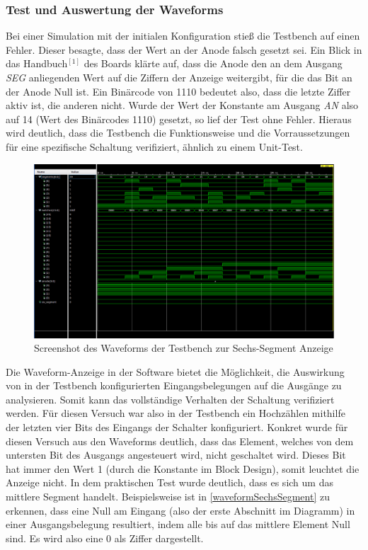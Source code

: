 \documentclass[11pt, a4paper]{article}
\begin{document}
\subsubsection*{Test und Auswertung der Waveforms}
Bei einer Simulation mit der initialen Konfiguration stieß die Testbench auf einen Fehler. Dieser besagte, dass der Wert an der Anode falsch gesetzt sei. Ein Blick in das Handbuch$^{[1]}$ des Boards klärte auf, dass die Anode den an dem Ausgang \textit{SEG} anliegenden Wert auf die Ziffern der Anzeige weitergibt, für die das Bit an der Anode Null ist. Ein Binärcode von 1110 bedeutet also, dass die letzte Ziffer aktiv ist, die anderen nicht.
Wurde der Wert der Konstante am Ausgang \textit{AN} also auf 14 (Wert des Binärcodes 1110) gesetzt, so lief der Test ohne Fehler.
Hieraus wird deutlich, dass die Testbench die Funktionsweise und die Vorraussetzungen für eine spezifische Schaltung verifiziert, ähnlich zu einem Unit-Test.
\begin{figure}[H]    
    \centering
    \includegraphics[width=\linewidth]{versuch1Data/waveform1.png}
    \caption{Screenshot des Waveforms der Testbench zur Sechs-Segment Anzeige}
    \label{waveformSechsSegment}        
\end{figure}
Die Waveform-Anzeige in der Software bietet die Möglichkeit, die Auswirkung von in der Testbench konfigurierten Eingangsbelegungen auf die Ausgänge zu analysieren. Somit kann das vollständige Verhalten der Schaltung verifiziert werden.
Für diesen Versuch war also in der Testbench ein Hochzählen mithilfe der letzten vier Bits des Eingangs der Schalter konfiguriert.
Konkret wurde für diesen Versuch aus den Waveforms deutlich, dass das Element, welches von dem untersten Bit des Ausgangs angesteuert wird, nicht geschaltet wird. Dieses Bit hat immer den Wert 1 (durch die Konstante im Block Design), somit leuchtet die Anzeige nicht. In dem praktischen Test wurde deutlich, dass es sich um das mittlere Segment handelt.
Beispielsweise ist in \autoref{waveformSechsSegment} zu erkennen, dass eine Null am Eingang (also der erste Abschnitt im Diagramm) in einer Ausgangsbelegung resultiert, indem alle bis auf das mittlere Element Null sind. Es wird also eine 0 als Ziffer dargestellt.
\end{document}
